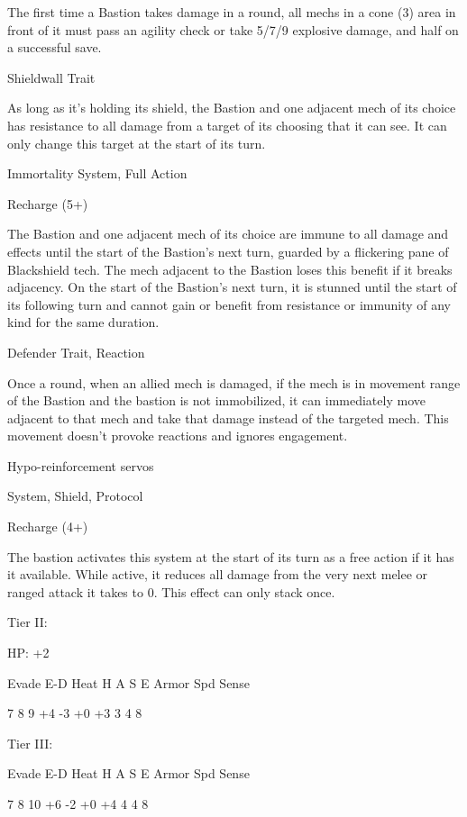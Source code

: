 The first time a Bastion takes damage in a round, all mechs in a cone (3) area in front of it must  
pass an agility check or take 5/7/9 explosive damage, and half on a successful save.
 

Shieldwall  
Trait
 
As long as it’s holding its shield, the Bastion and one adjacent mech of its choice has resistance  
to all damage from a target of its choosing that it can see. It can only change this target at the  
start of its turn.
 

Immortality  
System, Full Action
 
Recharge (5+)
 
The Bastion and one adjacent mech of its choice are immune to all damage and effects until the  
start of the Bastion’s next turn, guarded by a flickering pane of Blackshield tech. The mech  
adjacent to the Bastion loses this benefit if it breaks adjacency. On the start of the Bastion’s next  
turn, it is stunned until the start of its following turn and cannot gain or benefit from resistance or  
immunity of any kind for the same duration.
 

Defender  
Trait, Reaction
 
Once a round, when an allied mech is damaged, if the mech is in movement range of the Bastion  
and the bastion is not immobilized, it can immediately move adjacent to that mech and take that  
damage instead of the targeted mech. This movement doesn't provoke reactions and ignores  
engagement.
 

Hypo-reinforcement servos
 
System, Shield, Protocol
 
Recharge (4+)
 
The bastion activates this system at the start of its turn as a free action if it has it available. While  
active, it reduces all damage from the very next melee or ranged attack it takes to 0. This effect  
can only stack once.
 

Tier II:
 
HP: +2
 

          Evade     E-D    Heat    H     A     S     E       Armor        Spd      Sense 

          7         8      9       +4    -3    +0   +3       3            4        8 

Tier III:  

          Evade     E-D    Heat    H     A     S     E       Armor        Spd      Sense 

          7         8      10      +6    -2    +0   +4       4            4        8 
